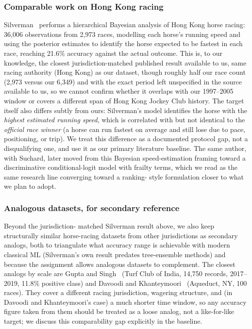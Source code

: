 \subsubsection*{\textbf{Comparable work on Hong Kong racing}} Silverman~\cite{ejeA_gupta2023}
performs a hierarchical Bayesian analysis of Hong Kong horse racing: 36,006
observations from 2,973 races, modelling each horse's running speed and using the
posterior estimates to identify the horse expected to be fastest in each race,
reaching 21.6\% accuracy against the actual outcome. This is, to our knowledge,
the closest jurisdiction-matched published result available to us, same racing
authority (Hong Kong) as our dataset, though roughly half our race count (2,973
versus our 6,349) and with the exact period left unspecified in the source
available to us, so we cannot confirm whether it overlaps with our 1997--2005
window or covers a different span of Hong Kong Jockey Club history. The target
itself also differs subtly from ours: Silverman's model identifies the horse with
the \textit{highest estimated running speed}, which is correlated with but not
identical to the \textit{official race winner} (a horse can run fastest on average
and still lose due to pace, positioning, or trip). We treat this difference as a
documented protocol gap, not a disqualifying one, and use it as our primary
literature baseline. The same author, with Suchard, later moved from this Bayesian
speed-estimation framing toward a discriminative conditional-logit model with
frailty terms, which we read as the same research line converging toward a ranking-
style formulation closer to what we plan to adopt.

\subsubsection*{\textbf{Analogous datasets, for secondary reference}} Beyond the jurisdiction-
matched Silverman result above, we also keep structurally similar horse-racing
datasets from other jurisdictions as secondary analogs, both to triangulate what
accuracy range is achievable with modern classical ML (Silverman's own result
predates tree-ensemble methods) and because the assignment allows analogous
datasets to complement. The closest analogs by scale are Gupta and
Singh~\cite{ejeA_gupta2023,ejeA_gupta2024b} (Turf Club of India, 14,750 records,
2017--2019, 11.8\% positive class) and Davoodi and Khanteymoori~\cite{ejeA_davoodi2010}
(Aqueduct, NY, 100 races). They cover a different racing jurisdiction, wagering
structure, and (in Davoodi and Khanteymoori's case) a much shorter time window, so
any accuracy figure taken from them should be treated as a loose analog, not a
like-for-like target; we discuss this comparability gap explicitly in the baseline.

